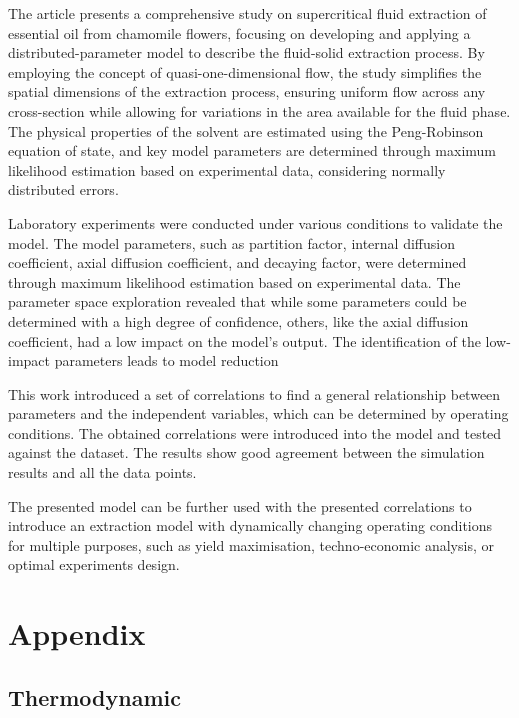\documentclass[a4paper,fleqn]{cas-dc}
\begin{document}
The article presents a comprehensive study on supercritical fluid extraction of essential oil from chamomile flowers, focusing on developing and applying a distributed-parameter model to describe the fluid-solid extraction process. By employing the concept of quasi-one-dimensional flow, the study simplifies the spatial dimensions of the extraction process, ensuring uniform flow across any cross-section while allowing for variations in the area available for the fluid phase. The physical properties of the solvent are estimated using the Peng-Robinson equation of state, and key model parameters are determined through maximum likelihood estimation based on experimental data, considering normally distributed errors.

Laboratory experiments were conducted under various conditions to validate the model. The model parameters, such as partition factor, internal diffusion coefficient, axial diffusion coefficient, and decaying factor, were determined through maximum likelihood estimation based on experimental data. The parameter space exploration revealed that while some parameters could be determined with a high degree of confidence, others, like the axial diffusion coefficient, had a low impact on the model's output. The identification of the low-impact parameters leads to model reduction

This work introduced a set of correlations to find a general relationship between parameters and the independent variables, which can be determined by operating conditions. The obtained correlations were introduced into the model and tested against the dataset. The results show good agreement between the simulation results and all the data points.

The presented model can be further used with the presented correlations to introduce an extraction model with dynamically changing operating conditions for multiple purposes, such as yield maximisation, techno-economic analysis, or optimal experiments design.

\clearpage
%



\clearpage \appendix \label{appendix}
\section{Appendix} 
\subsection{Thermodynamic}

\end{document}
